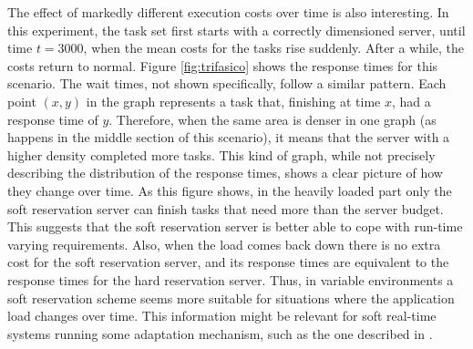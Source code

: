 \documentclass[times, 10pt,twocolumn]{article}
\begin{document}
The effect of markedly different execution costs over time is also
interesting. In this experiment, the task set first starts with a
correctly dimensioned server, until time $t=3000$, when the mean costs
for the tasks rise suddenly. After a while, the costs return to
normal. Figure \ref{fig:trifasico} shows the response times for this
scenario. The wait times, not shown specifically, follow a similar
pattern. Each point $(x,y)$ in the graph represents a task that,
finishing at time $x$, had a response time of $y$. Therefore, when the
same area is denser in one graph (as happens in the middle section of
this scenario), it means that the server with a higher density
completed more tasks. This kind of graph, while not precisely
describing the distribution of the response times, shows a clear
picture of how they change over time. As this figure shows, in the
heavily loaded part only the soft reservation server can finish tasks
that need more than the server budget. This suggests that the soft
reservation server is better able to cope with run-time varying
requirements. Also, when the load comes back down there is no extra
cost for the soft reservation server, and its response times are
equivalent to the response times for the hard reservation
server. Thus, in variable environments a soft reservation scheme seems
more suitable for situations where the application load changes over
time. This information might be relevant for soft real-time systems
running some adaptation mechanism, such as the one described in
\cite{abeni.ea05:qos}.
\end{document}
